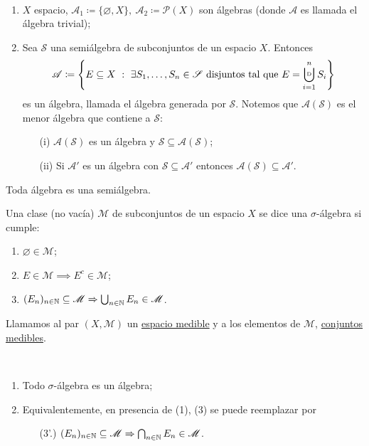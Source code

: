 \begin{eg}~
	\begin{enumerate}
		\item $X$ espacio, $\mathscr{A}_1 \coloneq \{\varnothing, X\},\ \mathscr{A}_2 \coloneq \mathcal{P}(X)$ son álgebras (donde $\mathscr{A}$ es llamada el álgebra trivial);

		\item Sea $\mathscr{S}$ una semiálgebra de subconjuntos de un espacio $X$. Entonces 
		\[ \mathscr{A} \coloneq \left\{ E \subseteq X \ : \ \exists S_1,\dots,S_n \in \mathscr{S} \text{ disjuntos tal que } E = \displaystyle\bigcupd_{i=1}^{n} S_i \right\} \] 
		es un álgebra, llamada el álgebra generada por $\mathscr{S}$. Notemos que $\mathscr{A}(\mathscr{S})$ es el menor álgebra que contiene a $\mathscr{S}$:
		\begin{enumerate}
			\item[(i)] $\mathscr{A}(\mathscr{S})$ es un álgebra y $\mathscr{S} \subseteq \mathscr{A}(\mathscr{S})$;

			\item[(ii)] Si $\mathscr{A}'$ es un álgebra con $\mathscr{S} \subseteq \mathscr{A}'$ entonces $\mathscr{A}(\mathscr{S}) \subseteq \mathscr{A}'$.
		\end{enumerate}
	\end{enumerate}
\end{eg}
\begin{note}
	Toda álgebra es una semiálgebra.
\end{note}

\begin{definition}
	Una clase (no vacía) $\mathscr{M}$ de subconjuntos de un espacio $X$ se dice una $\sigma$-álgebra si cumple:
	\begin{enumerate}
		\item $\varnothing \in \mathscr{M}$;

		\item $E \in \mathscr{M} \implies E^c \in \mathscr{M}$;

		\item $(E_n)_{n\in\mathbb{N}} \subseteq \mathscr{M} \Rightarrow \bigcup_{n\in\mathbb{N}} E_n \in \mathscr{M}$.
	\end{enumerate}
	\noindent Llamamos al par $(X,\mathscr{M})$ un \underline{espacio medible} y a los elementos de $\mathscr{M}$, \underline{conjuntos medibles}.
\end{definition}

\begin{note}~
	\begin{enumerate}
		\item Todo $\sigma$-álgebra es un álgebra;

		\item Equivalentemente, en presencia de (1), (3) se puede reemplazar por
		\begin{enumerate}
			\item[(3'.)] $(E_n)_{n\in\mathbb{N}} \subseteq \mathscr{M} \Rightarrow \bigcap_{n\in\mathbb{N}} E_n \in \mathscr{M}$.
		\end{enumerate}
	\end{enumerate}
\end{note}

